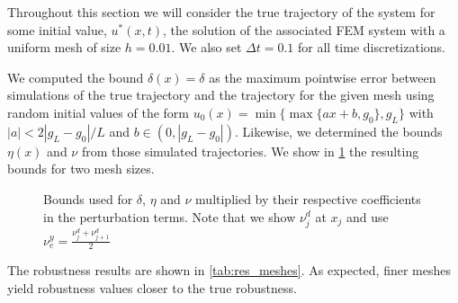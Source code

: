 \documentclass[oribibl]{llncs/llncs}
\begin{document}
Throughout this
section we will consider the true trajectory of the system for some initial
value, $u^*(x, t)$, the solution of the associated FEM system with a uniform mesh of
size $h = 0.01$. We also set $\Delta t = 0.1$ for all time discretizations.

We computed the bound $\delta(x) = \delta$ as the maximum pointwise
error between simulations of the true trajectory and the trajectory for the
given mesh using random initial values of the form $u_0(x) = \min\{\max\{a x +
b, g_0\}, g_L\}$ with $|a| < 2 |g_L - g_0| / L$ and $b \in (0, |g_L - g_0|)$.
Likewise, we determined the bounds $\eta(x)$ and $\nu$ from those simulated
trajectories. We show in \cref{fig:bounds} the resulting bounds for two mesh
sizes.

\begin{figure}[!t]
    \centering 
        \hfill
        \hfill
    \caption{Bounds used for $\delta$, $\eta$ and $\nu$ multiplied by their
    respective coefficients in the perturbation terms. Note that we show $\nu^d_j$ at
    $x_j$ and use $\nu_e^y = \frac{\nu^d_j + \nu^d_{j+1}}{2}$}
    \label{fig:bounds}
\end{figure}

The robustness results are shown in \cref{tab:res_meshes}. As expected, finer meshes
yield robustness values closer to the true robustness.
\end{document}
